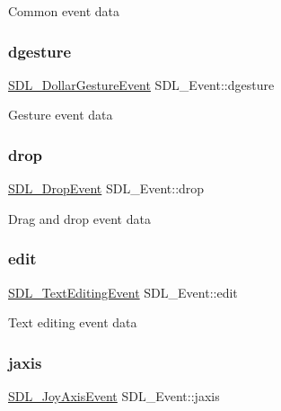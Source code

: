 Common event data \mbox{\label{union_s_d_l___event_a4481167b9f8549aeb254e97ca812e74d}} 
\subsubsection{\texorpdfstring{dgesture}{dgesture}}
{\footnotesize\ttfamily \hyperlink{struct_s_d_l___dollar_gesture_event}{S\+D\+L\+\_\+\+Dollar\+Gesture\+Event} S\+D\+L\+\_\+\+Event\+::dgesture}

Gesture event data \mbox{\label{union_s_d_l___event_acff77bccbca65abbb876360a3f5209c9}} 
\subsubsection{\texorpdfstring{drop}{drop}}
{\footnotesize\ttfamily \hyperlink{struct_s_d_l___drop_event}{S\+D\+L\+\_\+\+Drop\+Event} S\+D\+L\+\_\+\+Event\+::drop}

Drag and drop event data \mbox{\label{union_s_d_l___event_a9a7e3b67b2654d4c5fc509676c6a7183}} 
\subsubsection{\texorpdfstring{edit}{edit}}
{\footnotesize\ttfamily \hyperlink{struct_s_d_l___text_editing_event}{S\+D\+L\+\_\+\+Text\+Editing\+Event} S\+D\+L\+\_\+\+Event\+::edit}

Text editing event data \mbox{\label{union_s_d_l___event_ac4611acd0e9c675e67dc20919f0accb4}} 
\subsubsection{\texorpdfstring{jaxis}{jaxis}}
{\footnotesize\ttfamily \hyperlink{struct_s_d_l___joy_axis_event}{S\+D\+L\+\_\+\+Joy\+Axis\+Event} S\+D\+L\+\_\+\+Event\+::jaxis}

